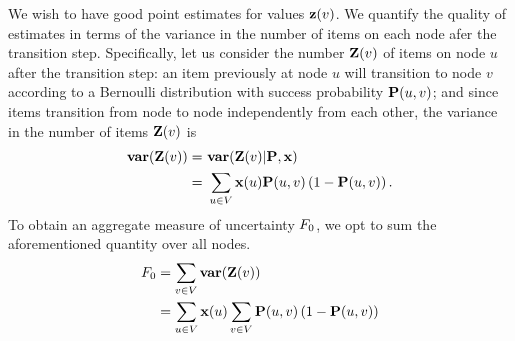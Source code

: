 We wish to have 
good point estimates for values $\mathbf{z}(v)$.
We quantify the quality of estimates in terms of the variance
in the number of items on each node afer the transition step.
Specifically, let us consider the number $\mathbf{Z}(v)$ of items
on node $u$ after the transition step:
an item previously at node $u$ will transition to
node $v$ according to a Bernoulli distribution with 
success probability $\mathbf{P}(u,v)$;
and since items transition from node to node independently from each other,
the variance in the number of items $\mathbf{Z}(v)$ is
\begin{align}
\mathbf{var}(\mathbf{Z}(v))  =\ & \mathbf{var}(\mathbf{Z}(v) | \mathbf{P}, \mathbf{x}) \nonumber \\
 =\ & \sum_{u\in V}\mathbf{x}(u)\mathbf{P}(u,v)\left(1-\mathbf{P}(u,v)\right).
\end{align}
To obtain an aggregate measure of uncertainty $F_0$,
we opt to sum the aforementioned quantity over all nodes.
\begin{align}
F_0 & = \sum_{v\in V}{\mathbf{var}(\mathbf{Z}(v))} \nonumber  \\
 & = \sum_{u\in V}\mathbf{x}(u)\sum_{v\in V}\mathbf{P}(u,v)\left(1-\mathbf{P}(u,v)\right) 
\label{eq:uncertainty}
\end{align}

